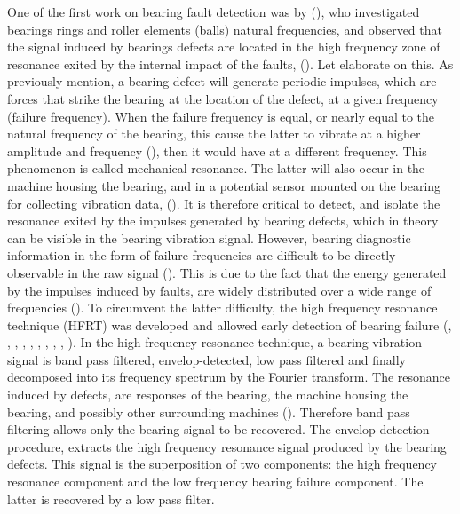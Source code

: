 \documentclass[../Main/thesis.tex]{subfiles}
\begin{document}
\justify
One of the first work on bearing fault detection was by (\cite{balderston1969}), who investigated bearings rings and roller elements (balls) natural frequencies, and observed that the signal induced by bearings defects are located in the high frequency zone of resonance exited by the internal impact of the faults, (\cite{randal2010}). Let elaborate on this. As previously mention, a bearing defect will generate periodic impulses, which are forces that strike the bearing at the location of the defect, at a given frequency (failure frequency). When the failure frequency is equal, or nearly equal to the natural frequency of the bearing, this cause the latter to vibrate at a higher amplitude and frequency (\cite{mcfadden1984a}), then it would have at a different frequency. This phenomenon is called mechanical resonance. The latter will also occur in the machine housing the bearing, and in a potential sensor mounted on the bearing for collecting vibration data, (\cite{mcfadden1984a}).
\justify
 It is therefore critical to detect, and isolate the resonance exited by the impulses generated by bearing defects, which in theory can be visible in the bearing vibration signal. However, bearing diagnostic information in the form of failure frequencies are  difficult to be directly observable in the raw signal (\cite{randal2010}). This is due to the fact that the energy generated by the impulses induced by faults, are widely distributed over a wide range of frequencies (\cite{randal2010}).
 \justify
 To circumvent the latter difficulty, the high frequency resonance technique (HFRT) was developed and  allowed early detection of bearing failure (\cite{broderick1972}, \cite{burchill1973}, \cite{burchill1973b}, \cite{darlow1974}, \cite{darlow1975}, \cite{darlow1975b}, \cite{board1975},  \cite{randal2010}, \cite{gupta2016}, \cite{khadersab2018}).
In the high frequency resonance technique, a bearing vibration signal is  band pass filtered, envelop-detected, low pass filtered and finally decomposed into its frequency spectrum by the Fourier transform.
\justify
 The resonance induced by defects, are responses of the bearing, the machine housing the bearing, and possibly other surrounding machines (\cite{mcfadden1984a}). Therefore band pass filtering allows only the bearing signal to be recovered.
 The envelop detection procedure, extracts the high frequency resonance signal produced by the bearing defects. This signal is the superposition of two components: the high frequency resonance component and the low frequency bearing failure component. The latter is recovered by a low pass filter. 
\end{document}
